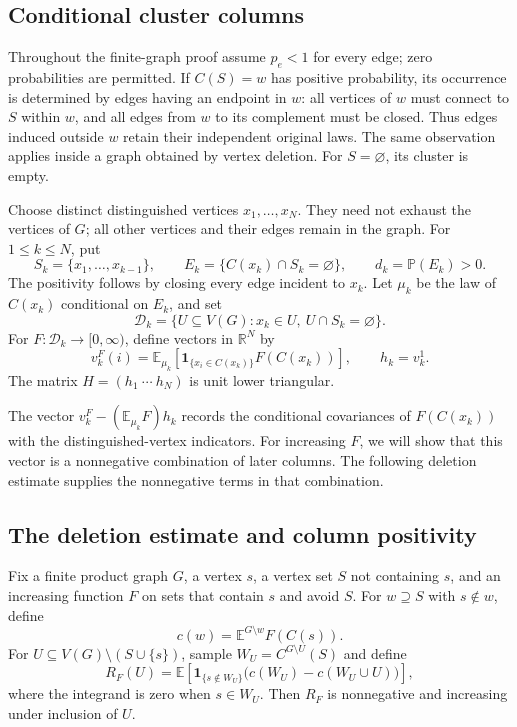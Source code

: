 \subsection{Conditional cluster columns}

Throughout the finite-graph proof assume $p_e<1$ for every edge; zero
probabilities are permitted.  If $C(S)=w$ has positive probability, its
occurrence is determined by edges having an endpoint in $w$: all vertices
of $w$ must connect to $S$ within $w$, and all edges from $w$ to its
complement must be closed.  Thus edges induced outside $w$ retain their
independent original laws.  The same observation applies inside a graph
obtained by vertex deletion.  For $S=\varnothing$, its cluster is empty.

Choose distinct distinguished vertices $x_1,\ldots,x_N$.
They need not exhaust the vertices of $G$; all other vertices and their
edges remain in the graph.  For $1\le k\le N$, put
\[
 S_k=\{x_1,\ldots,x_{k-1}\},\qquad
 E_k=\{C(x_k)\cap S_k=\varnothing\},\qquad d_k=\mathbb P(E_k)>0.
\]
The positivity follows by closing every edge incident to $x_k$.
Let $\mu_k$ be the law of $C(x_k)$ conditional on $E_k$, and set
\[
 \mathcal D_k=\{U\subseteq V(G):x_k\in U,\ U\cap S_k=\varnothing\}.
\]
For $F:\mathcal D_k\to[0,\infty)$, define vectors in $\mathbb R^N$ by
\[
 v_k^F(i)=\mathbb E_{\mu_k}
              [\mathbf1_{\{x_i\in C(x_k)\}}F(C(x_k))],
 \qquad h_k=v_k^1.
\]
The matrix $H=(h_1\ \cdots\ h_N)$ is unit lower triangular.

The vector $v_k^F-(\mathbb E_{\mu_k}F)h_k$ records the conditional
covariances of $F(C(x_k))$ with the distinguished-vertex indicators.
For increasing $F$, we will show that this vector is a nonnegative
combination of later columns.
The following deletion estimate supplies the nonnegative terms in that
combination.

\subsection{The deletion estimate and column positivity}

\begin{lemma}
\label{lem:deleted-residual}
Fix a finite product graph $G$, a vertex $s$, a vertex set $S$ not
containing $s$, and an increasing function $F$ on sets that contain $s$
and avoid $S$.  For $w\supseteq S$ with $s\notin w$, define
\[
 c(w)=\mathbb E^{G\setminus w}F(C(s)).
\]
For $U\subseteq V(G)\setminus(S\cup\{s\})$, sample
$W_U=C^{G\setminus U}(S)$ and define
\[
 R_F(U)=\mathbb E\left[
  \mathbf1_{\{s\notin W_U\}}
       \bigl(c(W_U)-c(W_U\cup U)\bigr)\right],
\]
where the integrand is zero when $s\in W_U$.  Then $R_F$ is nonnegative
and increasing under inclusion of $U$.
\end{lemma}

